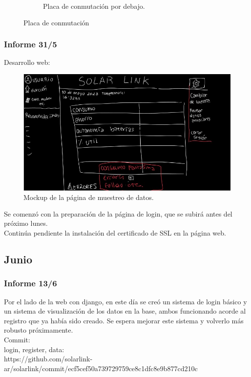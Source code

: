 \begin{figure}[H]
\begin{subfigure}{0.5\textwidth}
\caption{Placa de conmutación por debajo.}
\end{subfigure}

\caption{Placa de conmutación}
\end{figure}

\subsubsection{Informe 31/5}
Desarrollo web:\\

\begin{figure}[H]
    \centering
    \includegraphics[width=0.75\linewidth]{informes/Screenshot_28.jpg}
    \caption{Mockup de la página de muestreo de datos.}
    
\end{figure}

Se comenzó con la preparación de la página de login, que se subirá antes del próximo lunes.\\

Continúa pendiente la instalación del certificado de SSL en la página web.\\


\subsection{Junio}

\subsubsection{Informe 13/6}

Por el lado de la web con django, en este día se creó un sistema de login básico y un sistema de visualización de los datos en la base, ambos funcionando acorde al registro que ya había sido creado. Se espera mejorar este sistema y volverlo más robusto próximamente.\\

Commit:\\
login, register, data:\\
https://github.com/solarlink-\\ar/solarlink/commit/ecf5cef50a739729759ce8c1dfc8e9b877cd210c\\

